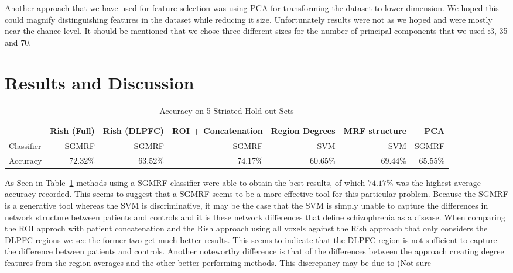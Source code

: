\documentclass{article} %
\begin{document}
Another approach that we have used for feature selection was using PCA for transforming the dataset to lower dimension. We hoped this could magnify distinguishing features in the dataset while reducing it size. Unfortunately results were not as we hoped and were mostly near the chance level. It should be mentioned that we chose three different sizes for the number of principal components that we used :3, 35 and 70.   


\section{Results and Discussion}

\begin{table}[!htb]\footnotesize
\begin{center}
    \begin{tabular}{| l | r | r | r | r | r | r |}
    \hline
                & Rish (Full) & Rish (DLPFC) & ROI + Concatenation & Region Degrees & MRF structure & PCA     \\ \hline
    Classifier  & SGMRF       & SGMRF        & SGMRF               & SVM            & SVM           & SGMRF   \\ \hline
    Accuracy    & 72.32\%     & 63.52\%      & 74.17\%             & 60.65\%        & 69.44\%       & 65.55\% \\ \hline
    \end{tabular}
    \caption{Accuracy on 5 Striated Hold-out Sets}
     \label{fig:holdout_table}
\end{center}
\end{table}

As Seen in Table~\ref{fig:holdout_table} methods using a SGMRF classifier were
able to obtain the best results, of which $74.17\%$ was the highest average
accuracy recorded. This seems to suggest that a SGMRF seems to be a more
effective tool for this particular problem. Because the SGMRF is a generative
tool whereas the SVM is discriminative, it may be the case that the SVM is
simply unable to capture the differences in network structure between patients
and controls and it is these network differences that define schizophrenia as
a disease. When comparing the ROI approch with patient concatenation and the
Rish approach using all voxels against the Rish approach that only considers
the DLPFC regions we see the former two get much better results. This seems
to indicate that the DLPFC region is not sufficient to capture the difference
between patients and controls. Another noteworthy difference is that of the
differences between the approach creating degree features from the region
averages and the other better performing methods. This discrepancy may be due
to (Not sure %
\end{document}
